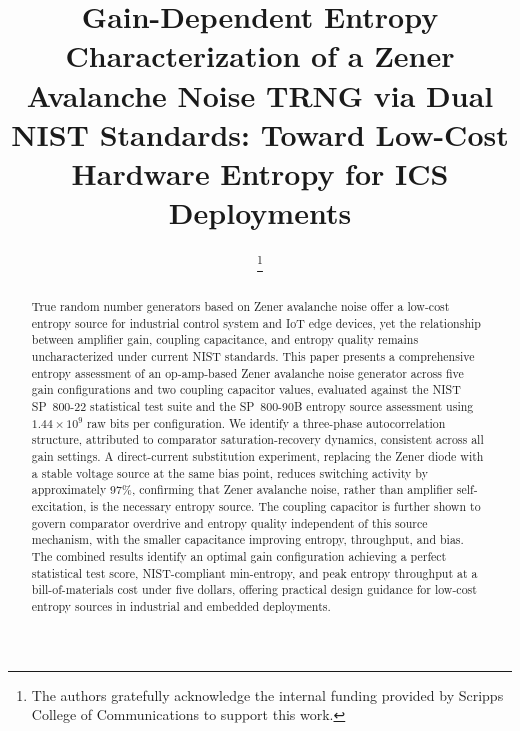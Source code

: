 \documentclass[conference]{IEEEtran}
\begin{document}
\title{Gain-Dependent Entropy Characterization of a Zener Avalanche Noise TRNG via Dual NIST Standards: Toward Low-Cost Hardware Entropy for ICS Deployments}

\author{

\thanks{The authors gratefully acknowledge the internal funding provided by Scripps College of Communications to support this work.}}
\maketitle

\begin{abstract}
True random number generators based on Zener avalanche noise offer a
low-cost entropy source for industrial control system and IoT edge
devices, yet the relationship between amplifier gain, coupling
capacitance, and entropy quality remains uncharacterized under
current NIST standards. This paper presents a comprehensive entropy
assessment of an op-amp-based Zener avalanche noise generator across
five gain configurations and two coupling capacitor values,
evaluated against the NIST SP~800-22 statistical test suite and the
SP~800-90B entropy source assessment using $1.44\!\times\!10^{9}$ raw bits per configuration. We identify a three-phase autocorrelation
structure, attributed to comparator saturation-recovery dynamics,
consistent across all gain settings. A direct-current substitution experiment, replacing the Zener diode
with a stable voltage source at the same bias point, reduces
switching activity by approximately 97\%, confirming that Zener
avalanche noise, rather than amplifier self-excitation, is the
necessary entropy source. The coupling
capacitor is further shown to govern comparator overdrive and entropy
quality independent of this source mechanism, with the smaller
capacitance improving entropy, throughput, and bias. The combined
results identify an optimal gain configuration achieving a perfect
statistical test score, NIST-compliant min-entropy, and peak entropy
throughput at a bill-of-materials cost under five dollars, offering
practical design guidance for low-cost entropy sources in industrial
and embedded deployments.
\end{abstract}
\end{document}
